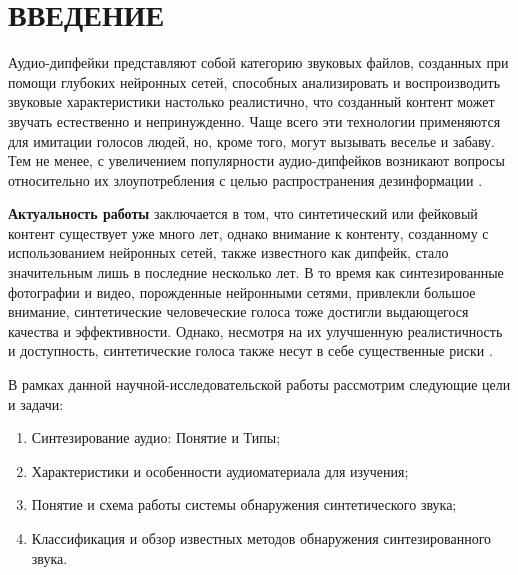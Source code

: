 \part*{ВВЕДЕНИЕ}

Аудио-дипфейки представляют собой категорию звуковых файлов, созданных при помощи глубоких нейронных сетей, способных анализировать и воспроизводить звуковые характеристики настолько реалистично, что созданный контент может звучать естественно и непринужденно. Чаще всего эти технологии применяются для имитации голосов людей, но, кроме того, могут вызывать веселье и забаву. Тем не менее, с увеличением популярности аудио-дипфейков возникают вопросы относительно их злоупотребления с целью распространения дезинформации \cite{chen2020generalization}.


\textbf{Актуальность работы} заключается в том, что синтетический или фейковый контент существует уже много лет, однако внимание к контенту, созданному с использованием нейронных сетей, также известного как дипфейк, стало значительным лишь в последние несколько лет. В то время как синтезированные фотографии и видео, порожденные нейронными сетями, привлекли большое внимание, синтетические человеческие голоса тоже достигли выдающегося качества и эффективности. Однако, несмотря на их улучшенную реалистичность и доступность, синтетические голоса также несут в себе существенные риски \cite{yi2022add}.

В рамках данной научной-исследовательской работы рассмотрим следующие цели и задачи:

\begin{enumerate}
    \item Синтезирование аудио: Понятие и Типы;
    \item Характеристики и особенности аудиоматериала для изучения;
    \item Понятие и схема работы системы обнаружения синтетического звука;
    \item Классификация и обзор известных методов обнаружения синтезированного звука.
\end{enumerate}


